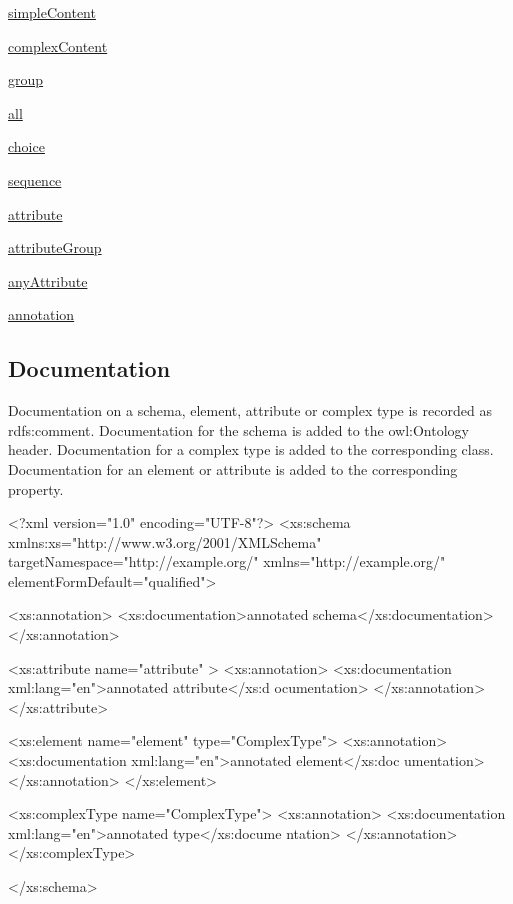 \begin{DoxyItemize}
\item \hyperlink{simplecontent}{simpleContent}
\item \hyperlink{complexcontent}{complexContent}
\item \hyperlink{group}{group}
\item \hyperlink{all}{all}
\item \hyperlink{choice}{choice}
\item \hyperlink{sequence}{sequence}
\item \hyperlink{attribute}{attribute}
\item \hyperlink{attributegroup}{attributeGroup}
\item \hyperlink{anyattribute}{anyAttribute}
\item \hyperlink{annotation}{annotation} 
\end{DoxyItemize}\hypertarget{documentation}{}\subsection{Documentation}\label{documentation}
Documentation on a schema, element, attribute or complex type is recorded as rdfs:comment. Documentation for the schema is added to the owl:Ontology header. Documentation for a complex type is added to the corresponding class. Documentation for an element or attribute is added to the corresponding property.


\begin{DoxyCodeInclude}
<?xml version="1.0" encoding="UTF-8"?>
<xs:schema xmlns:xs="http://www.w3.org/2001/XMLSchema" 
        targetNamespace="http://example.org/" xmlns="http://example.org/"
        elementFormDefault="qualified">
        
        <xs:annotation>
                <xs:documentation>annotated schema</xs:documentation>
        </xs:annotation>
        
        <xs:attribute name="attribute" >
                <xs:annotation>
                        <xs:documentation xml:lang="en">annotated attribute</xs:d
      ocumentation>
                </xs:annotation>
        </xs:attribute>

        <xs:element name="element" type="ComplexType">
                <xs:annotation>
                        <xs:documentation xml:lang="en">annotated element</xs:doc
      umentation>
                </xs:annotation>
        </xs:element>

        <xs:complexType name="ComplexType">
                <xs:annotation>
                        <xs:documentation xml:lang="en">annotated type</xs:docume
      ntation>
                </xs:annotation>
        </xs:complexType>

</xs:schema>
\end{DoxyCodeInclude}


